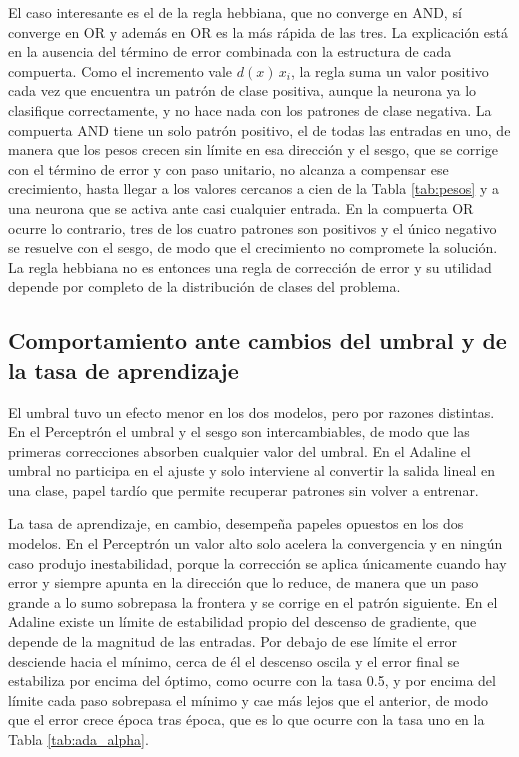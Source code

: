 \documentclass[11pt,letterpaper]{article}
\begin{document}
El caso interesante es el de la regla hebbiana, que no converge en AND, sí converge en OR y además en OR es la más rápida de las tres. La explicación está en la ausencia del término de error combinada con la estructura de cada compuerta. Como el incremento vale $d(x)\,x_i$, la regla suma un valor positivo cada vez que encuentra un patrón de clase positiva, aunque la neurona ya lo clasifique correctamente, y no hace nada con los patrones de clase negativa. La compuerta AND tiene un solo patrón positivo, el de todas las entradas en uno, de manera que los pesos crecen sin límite en esa dirección y el sesgo, que se corrige con el término de error y con paso unitario, no alcanza a compensar ese crecimiento, hasta llegar a los valores cercanos a cien de la Tabla \ref{tab:pesos} y a una neurona que se activa ante casi cualquier entrada. En la compuerta OR ocurre lo contrario, tres de los cuatro patrones son positivos y el único negativo se resuelve con el sesgo, de modo que el crecimiento no compromete la solución. La regla hebbiana no es entonces una regla de corrección de error y su utilidad depende por completo de la distribución de clases del problema.

\subsection{Comportamiento ante cambios del umbral y de la tasa de aprendizaje}

El umbral tuvo un efecto menor en los dos modelos, pero por razones distintas. En el Perceptrón el umbral y el sesgo son intercambiables, de modo que las primeras correcciones absorben cualquier valor del umbral. En el Adaline el umbral no participa en el ajuste y solo interviene al convertir la salida lineal en una clase, papel tardío que permite recuperar patrones sin volver a entrenar.

La tasa de aprendizaje, en cambio, desempeña papeles opuestos en los dos modelos. En el Perceptrón un valor alto solo acelera la convergencia y en ningún caso produjo inestabilidad, porque la corrección se aplica únicamente cuando hay error y siempre apunta en la dirección que lo reduce, de manera que un paso grande a lo sumo sobrepasa la frontera y se corrige en el patrón siguiente. En el Adaline existe un límite de estabilidad propio del descenso de gradiente, que depende de la magnitud de las entradas. Por debajo de ese límite el error desciende hacia el mínimo, cerca de él el descenso oscila y el error final se estabiliza por encima del óptimo, como ocurre con la tasa 0.5, y por encima del límite cada paso sobrepasa el mínimo y cae más lejos que el anterior, de modo que el error crece época tras época, que es lo que ocurre con la tasa uno en la Tabla \ref{tab:ada_alpha}.
\end{document}
